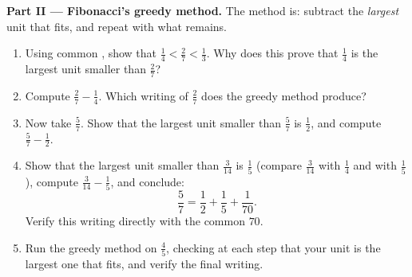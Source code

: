 \begin{problem}
\medskip
\noindent\textbf{Part II --- Fibonacci's greedy method.}
The method is: subtract the \emph{largest} unit  that
fits, and repeat with what remains.
\begin{enumerate}[resume]
  \item Using common , show that
        $\frac14 < \frac27 < \frac13$. Why does this prove that
        $\frac14$ is the largest unit  smaller than
        $\frac27$?
  \item Compute $\frac27 - \frac14$. Which writing of $\frac27$
        does the greedy method produce?
  \item Now take $\frac57$. Show that the largest unit 
        smaller than $\frac57$ is $\frac12$, and compute
        $\frac57 - \frac12$.
  \item Show that the largest unit  smaller than
        $\frac{3}{14}$ is $\frac15$ (compare $\frac{3}{14}$ with
        $\frac14$ and with $\frac15$), compute
        $\frac{3}{14} - \frac15$, and conclude:
        \[
        \frac57 = \frac12 + \frac15 + \frac{1}{70} .
        \]
        Verify this writing directly with the common 
        $70$.
  \item Run the greedy method on $\frac45$, checking at each step
        that your unit  is the largest one that fits, and
        verify the final writing.
\end{enumerate}


\end{problem}
